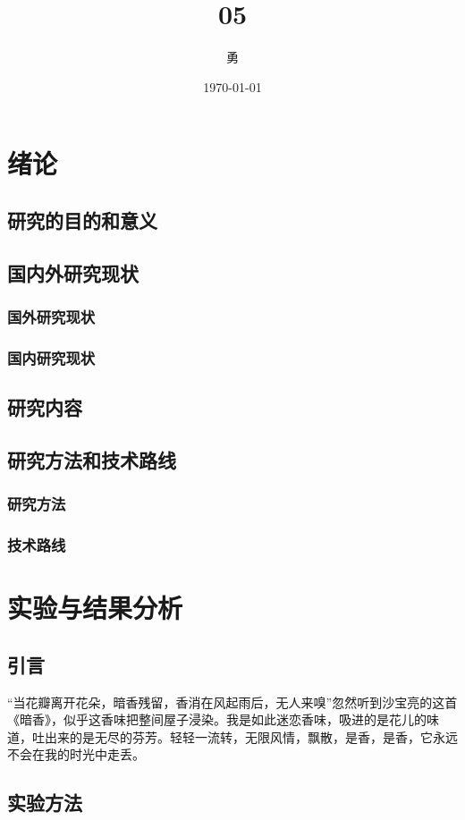 \documentclass{ctexbook}
\title{05}
\author{勇}
\date{\today}
\begin{document}
	\tableofcontents
	\chapter{绪论}
	\section{研究的目的和意义}
	\section{国内外研究现状}
	\subsection{国外研究现状}
	\subsection{国内研究现状}
	\section{研究内容}
	\section{研究方法和技术路线}
	\subsection{研究方法}
	\subsection{技术路线}
	\chapter{实验与结果分析}
	\section{引言}
	“当花瓣离开花朵，暗香残留，香消在风起雨后，无人来嗅”忽然听到沙宝亮的这首《暗香》，似乎这香味把整间屋子浸染。我是如此迷恋香味，吸进的是花儿的味道，吐出来的是无尽的芬芳。轻轻一流转，无限风情，飘散，是香，是香，它永远不会在我的时光中走丢。
	\section{实验方法}
\end{document}
